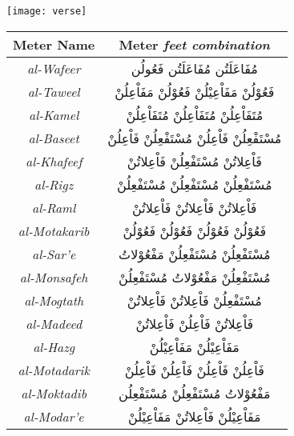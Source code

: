 \documentclass[12pt]{report}
\begin{document}
\begin{center}
\texttt{[image: verse]}
\end{center}


 


\begin{center}
  \begin{tabular}[h!]{|c|c|} 
    \hline
    \textbf{Meter Name} & \textbf{Meter} \small{\textit{feet combination}} \\ 
    \hline
   \textit{al-Wafeer}    & \textarabic{مُفَاعَلَتُن مُفَاعَلَتُن فَعُولُن} \\ %
   \textit{al-Taweel}    & \textarabic{فَعُوْلُنْ مَفَاْعِيْلُنْ فَعُوْلُنْ مَفَاْعِلُنْ} \\ %
   \textit{al-Kamel}     & \textarabic{مُتَفَاْعِلُنْ مُتَفَاْعِلُنْ مُتَفَاْعِلُنْ} \\%
   \textit{al-Baseet}    & \textarabic{مُسْتَفْعِلُنْ فَاْعِلُنْ مُسْتَفْعِلُنْ فَاْعِلُنْ} \\%
   \textit{al-Khafeef}   & \textarabic{فَاْعِلاتُنْ مُسْتَفْعِلُنْ فَاْعِلاتُنْ} \\ %
   \textit{al-Rigz}      & \textarabic{مُسْتَفْعِلُنْ مُسْتَفْعِلُنْ مُسْتَفْعِلُنْ} \\%
   \textit{al-Raml}      & \textarabic{فَاْعِلاتُنْ فَاْعِلاتُنْ فَاْعِلاتُنْ} \\ %
   \textit{al-Motakarib} & \textarabic{فَعُوْلُنْ فَعُوْلُنْ فَعُوْلُنْ فَعُوْلُنْ} \\%
   \textit{al-Sar'e}     & \textarabic{مُسْتَفْعِلُنْ مُسْتَفْعِلُنْ مَفْعُوْلاتُ} \\%
   \textit{al-Monsafeh}  & \textarabic{مُسْتَفْعِلُنْ مَفْعُوْلاتُ مُسْتَفْعِلُنْ} \\
   \textit{al-Mogtath}   & \textarabic{مُسْتَفْعِلُنْ فَاْعِلاتُنْ فَاْعِلاتُنْ} \\
   \textit{al-Madeed}    & \textarabic{فَاْعِلاتُنْ فَاْعِلُنْ فَاْعِلاتُنْ } \\
   \textit{al-Hazg}      & \textarabic{مَفَاْعِيْلُنْ مَفَاْعِيْلُنْ} \\%
   \textit{al-Motadarik} & \textarabic{فَاْعِلُنْ فَاْعِلُنْ فَاْعِلُنْ فَاْعِلُنْ} \\%
   \textit{al-Moktadib}  & \textarabic{مَفْعُوْلاتُ مُسْتَفْعِلُنْ مُسْتَفْعِلُن} \\
   \textit{al-Modar'e}   & \textarabic{مَفَاْعِيْلُنْ فَاْعِلاتُنْ مَفَاْعِيْلُنْ} \\
    \hline
  \end{tabular}
  \label{arud:meters}
\end{center}
\end{document}
